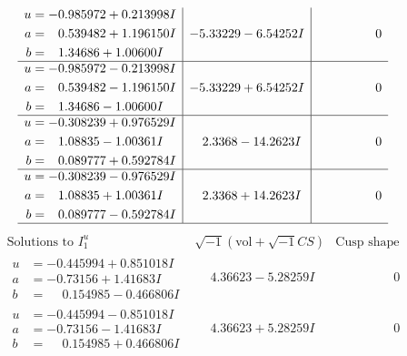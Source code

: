 \documentclass[1p]{elsarticle_modified}
\theoremstyle{definition}
\newcommand{\I}{\sqrt{-1}}
\begin{document}
$$\begin{array}{c|c|c}
\begin{aligned}
u &= -0.985972 + 0.213998 I \\
a &= \phantom{-}0.539482 + 1.196150 I \\
b &= \phantom{-}1.34686 + 1.00600 I\end{aligned}
 & -5.33229 - 6.54252 I & \phantom{-0.000000 } 0 \\ \hline\begin{aligned}
u &= -0.985972 - 0.213998 I \\
a &= \phantom{-}0.539482 - 1.196150 I \\
b &= \phantom{-}1.34686 - 1.00600 I\end{aligned}
 & -5.33229 + 6.54252 I & \phantom{-0.000000 } 0 \\ \hline\begin{aligned}
u &= -0.308239 + 0.976529 I \\
a &= \phantom{-}1.08835 - 1.00361 I \\
b &= \phantom{-}0.089777 + 0.592784 I\end{aligned}
 & \phantom{-}2.3368 - 14.2623 I & \phantom{-0.000000 } 0 \\ \hline\begin{aligned}
u &= -0.308239 - 0.976529 I \\
a &= \phantom{-}1.08835 + 1.00361 I \\
b &= \phantom{-}0.089777 - 0.592784 I\end{aligned}
 & \phantom{-}2.3368 + 14.2623 I & \phantom{-0.000000 } 0\\
 \hline 
 \end{array}$$\newpage$$\begin{array}{c|c|c}  
\text{Solutions to }I^u_{1}& \I (\text{vol} + \sqrt{-1}CS) & \text{Cusp shape}\\
 \hline 
\begin{aligned}
u &= -0.445994 + 0.851018 I \\
a &= -0.73156 + 1.41683 I \\
b &= \phantom{-}0.154985 - 0.466806 I\end{aligned}
 & \phantom{-}4.36623 - 5.28259 I & \phantom{-0.000000 } 0 \\ \hline\begin{aligned}
u &= -0.445994 - 0.851018 I \\
a &= -0.73156 - 1.41683 I \\
b &= \phantom{-}0.154985 + 0.466806 I\end{aligned}
 & \phantom{-}4.36623 + 5.28259 I & \phantom{-0.000000 } 0 \\ \hline\begin{aligned}

\end{aligned}
\end{array}$$
\end{document}
